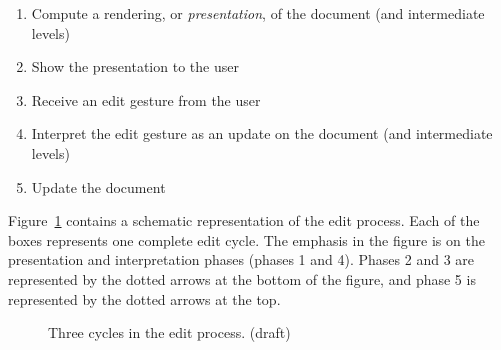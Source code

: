 \begin{enumerate}
\item Compute a rendering, or {\it presentation}, of the document (and intermediate levels)
\item Show the presentation to the user
\item Receive an edit gesture from the user
\item Interpret the edit gesture as an update on the document (and intermediate levels)
\item Update the document
\end{enumerate}

Figure~\ref{simpleeditprocess} contains a schematic representation of the edit process. Each of the boxes represents one complete edit cycle. The emphasis in the figure is on the presentation and interpretation phases (phases 1 and 4). Phases 2 and 3 are represented by the dotted arrows at the bottom of the figure, and phase 5 is represented by the dotted arrows at the top.

\begin{figure}
\begin{small}
\begin{center}
\begin{center}
\begin{scriptsize}
\end{scriptsize}
\end{center}\caption{Three cycles in the edit process. (draft)}\label{simpleeditprocess} 
\end{center}
\end{small}
\end{figure}

